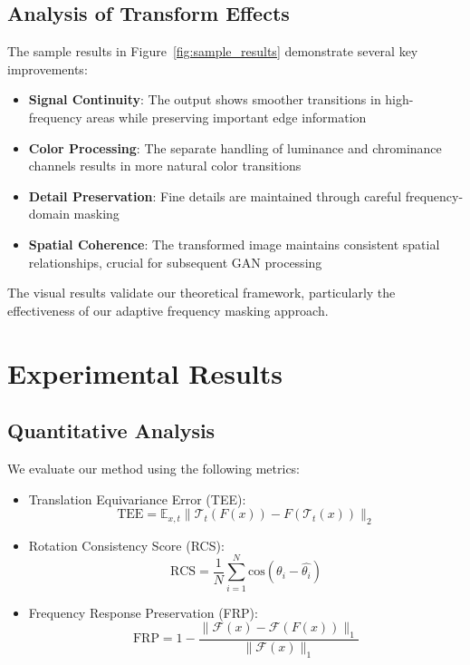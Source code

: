 \documentclass{article}
\begin{document}
\subsection{Analysis of Transform Effects}
The sample results in Figure~\ref{fig:sample_results} demonstrate several key improvements:

\begin{itemize}
    \item \textbf{Signal Continuity}: The output shows smoother transitions in high-frequency areas while preserving important edge information
    \item \textbf{Color Processing}: The separate handling of luminance and chrominance channels results in more natural color transitions
    \item \textbf{Detail Preservation}: Fine details are maintained through careful frequency-domain masking
    \item \textbf{Spatial Coherence}: The transformed image maintains consistent spatial relationships, crucial for subsequent GAN processing
\end{itemize}

The visual results validate our theoretical framework, particularly the effectiveness of our adaptive frequency masking approach.

\section{Experimental Results}
\subsection{Quantitative Analysis}
We evaluate our method using the following metrics:

\begin{itemize}
\item Translation Equivariance Error (TEE):
\begin{equation}
\text{TEE} = \mathbb{E}_{x,t}\|\mathcal{T}_t(F(x)) - F(\mathcal{T}_t(x))\|_2
\end{equation}

\item Rotation Consistency Score (RCS):
\begin{equation}
\text{RCS} = \frac{1}{N}\sum_{i=1}^N \text{cos}(\theta_i - \hat{\theta_i})
\end{equation}

\item Frequency Response Preservation (FRP):
\begin{equation}
\text{FRP} = 1 - \frac{\|\mathcal{F}(x) - \mathcal{F}(F(x))\|_1}{\|\mathcal{F}(x)\|_1}
\end{equation}
\end{itemize}
\end{document}
